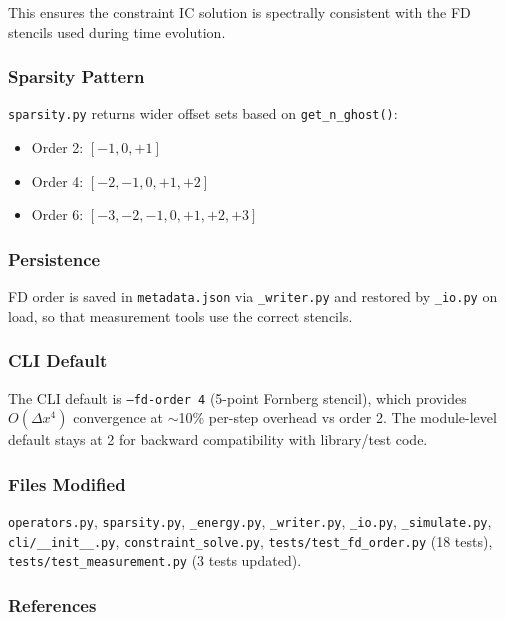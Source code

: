 This ensures the constraint IC solution is spectrally consistent with the
FD stencils used during time evolution.

\subsubsection{Sparsity Pattern}
\label{sec:sparsity-fd}

\texttt{sparsity.py} returns wider offset sets based on \texttt{get\_n\_ghost()}:

\begin{itemize}
  \item Order 2: $[-1, 0, +1]$
  \item Order 4: $[-2, -1, 0, +1, +2]$
  \item Order 6: $[-3, -2, -1, 0, +1, +2, +3]$
\end{itemize}

\subsubsection{Persistence}
\label{sec:fd-persistence}

FD order is saved in \texttt{metadata.json} via \texttt{\_writer.py} and restored by \texttt{\_io.py}
on load, so that measurement tools use the correct stencils.

\subsubsection{CLI Default}
\label{sec:fd-cli-default}

The CLI default is \texttt{--fd-order 4} (5-point Fornberg stencil), which provides
$O(\Delta x^4)$ convergence at $\sim$10\% per-step overhead vs order 2. The module-level
default stays at 2 for backward compatibility with library/test code.

\subsubsection{Files Modified}
\label{sec:fd-files}

\texttt{operators.py}, \texttt{sparsity.py}, \texttt{\_energy.py}, \texttt{\_writer.py}, \texttt{\_io.py},
\texttt{\_simulate.py}, \texttt{cli/\_\_init\_\_.py}, \texttt{constraint\_solve.py},
\texttt{tests/test\_fd\_order.py} (18 tests), \texttt{tests/test\_measurement.py} (3 tests updated).

\subsubsection{References}
\label{sec:fd-references}

